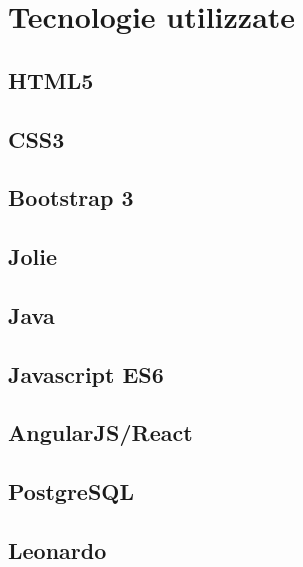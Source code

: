 \newpage
\section{Tecnologie utilizzate}

\subsection{HTML5}

\subsection{CSS3}

\subsection{Bootstrap 3}

\subsection{Jolie}

\subsection{Java}

\subsection{Javascript ES6}

\subsection{AngularJS/React}

\subsection{PostgreSQL}

\subsection{Leonardo}

